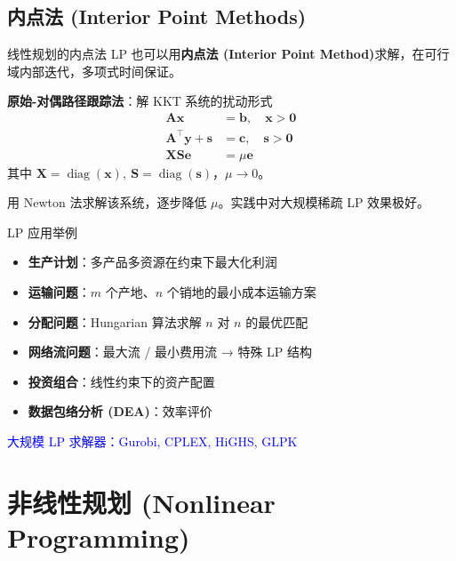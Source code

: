 \documentclass[11pt, aspectratio=169, svgnames, table, fontset=fandol]{ctexbeamer}
\newcommand{\diag}{\operatorname{diag}}
\begin{document}
\subsection{内点法 (Interior Point Methods)}

\begin{frame}{线性规划的内点法}
  LP 也可以用\textbf{内点法 (Interior Point Method)}求解，在可行域内部迭代，多项式时间保证。

  \vspace{6pt}
  \textbf{原始-对偶路径跟踪法}：解 KKT 系统的扰动形式
  \begin{align*}
    \bm{Ax} &= \bm{b}, \quad \bm{x} > \bm{0} \\
    \bm{A}^\top \bm{y} + \bm{s} &= \bm{c}, \quad \bm{s} > \bm{0} \\
    \bm{X} \bm{S} \bm{e} &= \mu \bm{e}
  \end{align*}
  其中 $\bm{X} = \diag(\bm{x}),\ \bm{S} = \diag(\bm{s})$，$\mu \to 0$。

  \vspace{6pt}
  用 Newton 法求解该系统，逐步降低 $\mu$。实践中对大规模稀疏 LP 效果极好。
\end{frame}

\begin{frame}{LP 应用举例}
  \begin{itemize}
    \item \textbf{生产计划}：多产品多资源在约束下最大化利润
    \item \textbf{运输问题}：$m$ 个产地、$n$ 个销地的最小成本运输方案
    \item \textbf{分配问题}：Hungarian 算法求解 $n$ 对 $n$ 的最优匹配
    \item \textbf{网络流问题}：最大流 / 最小费用流 → 特殊 LP 结构
    \item \textbf{投资组合}：线性约束下的资产配置
    \item \textbf{数据包络分析 (DEA)}：效率评价
  \end{itemize}
  \vspace{6pt}
  \begin{center}
    \textcolor{blue}{大规模 LP 求解器：Gurobi, CPLEX, HiGHS, GLPK}
  \end{center}
\end{frame}

\section{非线性规划 (Nonlinear Programming)}
\end{document}
